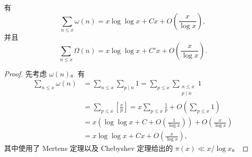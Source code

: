 \begin{theorem}[原文 Theorem 3.9]
	有
	\[
		\sum_{n\leq x}\omega(n)
		=
		x\log\log x+Cx+O\left(\frac{x}{\log x}\right),
	\]
	并且
	\[
		\sum_{n\leq x}\Omega(n)
		=
		x\log\log x+C'x+O\left(\frac{x}{\log x}\right).
	\]
\end{theorem}

\begin{proof}
	先考虑 $\omega(n)$。有
	\[
	\begin{aligned}
		\sum_{n\leq x}\omega(n)
		&=
		\sum_{n\leq x}\sum_{p\mid n}1
		=
		\sum_{p\leq x}\sum_{\substack{n\leq x\\ p\mid n}}1 \\
		&=
		\sum_{p\leq x}\left[\frac xp\right]
		=
		x\sum_{p\leq x}\frac1p+O\left(\sum_{p\leq x}1\right) \\
		&=
		x\left(\log\log x+C+O\left(\frac1{\log x}\right)\right)
		+O\left(\frac{x}{\log x}\right) \\
		&=
		x\log\log x+Cx+O\left(\frac{x}{\log x}\right),
	\end{aligned}
	\]
	其中使用了 Mertens 定理以及 Chebyshev 定理给出的 $\pi(x)\ll x/\log x$。


\end{proof}
